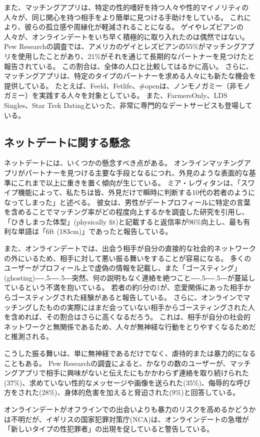 \documentclass[paper=a4,book,openany]{jlreq}
\newcommand{\ig}[1]{}           %
\def\DDASH{―\kern-.5\zw―\kern-.5\zw―}
\begin{document}
また、マッチングアプリは、特定の性的嗜好を持つ人々や性的マイノリティの人々が、同じ関心を持つ相手をより簡単に見つける手助けをしている。
これにより、彼らの孤立感や周縁化が軽減されることになる。
ゲイやレズビアンの人々が、オンラインデートをいち早く積極的に取り入れたのは偶然ではない。
Pew Researchの調査では、アメリカのゲイとレズビアンの55\%がマッチングアプリを使用したことがあり、21\%がそれを通じて長期的なパートナーを見つけたと報告されている。
この割合は、全体の人口と比較してはるかに高い。
さらに、マッチングアプリは、特定のタイプのパートナーを求める人々にも新たな機会を提供している。
たとえば、Feeld、Fetlife、\#openは、ノンモノガミー（非モノガミー）を実践する人々を対象としている。
また、FarmersOnly、LDS Singles、Star Trek Datingといった、非常に専門的なデートサービスも登場している。

\subsection{ネットデートに関する懸念}

ネットデートには、いくつかの懸念すべき点がある。
オンラインマッチングアプリがパートナーを見つける主要な手段となるにつれ、外見のような表面的な基準にこれまで以上に重きを置く傾向が生じている。
ミア・レヴィタンは、「スワイプ機能によって、私たちは皆、外見だけで瞬時に判断する10代の若者のようになってしまった」と述べる。
彼女は、男性がデートプロフィールに特定の言葉を含めることでマッチング率がどの程度向上するかを調査した研究を引用し、「ひきしまった体型」(physically fit)と記載すると返信率が96\%向上し、最も有利な単語は「6ft (183cm)」であったと報告している\citep{levitan20:_futur_seduc_lond,dodgson18:_usin_thes_word}。

また、オンラインデートでは、出会う相手が自分の直接的な社会的ネットワークの外にいるため、相手に対して悪い振る舞いをすることが容易になる。
多くのユーザーがプロフィール上で虚偽の情報を記載し、また「ゴースティング」(ghosting){\DDASH}突然、何の説明もなく連絡を絶つこと{\DDASH}が蔓延しているという不満を抱いている。
若者の約5分の1が、恋愛関係にあった相手からゴースティングされた経験があると報告している\citep{yougov14:_poll_resul,navarro20:_psyc_corr_ghos_bread_exper}。
さらに、オンラインでマッチングしたものの実際にはまだ会っていない相手からゴースティングされた人を含めれば、その割合はさらに高くなるだろう。
これは、相手が自分の社会的ネットワークと無関係であるため、人々が無神経な行動をとりやすくなるためだと推測される。

こうした振る舞いは、単に無神経であるだけでなく、虐待的または暴力的になることもある。
Pew Researchの調査によると、かなりの数のユーザーが、マッチングアプリで相手に興味がないと伝えたにもかかわらず連絡を取り続けられた(37\%)、求めていない性的なメッセージや画像を送られた(35\%)、侮辱的な呼び方をされた(28\%)、身体的危害を加えると脅迫された(9\%)と回答している\citep{anderson20:_virt_down_onlin_datin}。
\ig{Monica Anderson}
オンラインデートがオフラインでの出会いよりも暴力のリスクを高めるかどうかは不明だが、イギリスの国家犯罪対策庁(NCA)は、オンラインデートの急増が「新しいタイプの性犯罪者」の出現を促していると警告している\citep{doria20:_are_datin_apps_safe_unsaf}。
\end{document}
